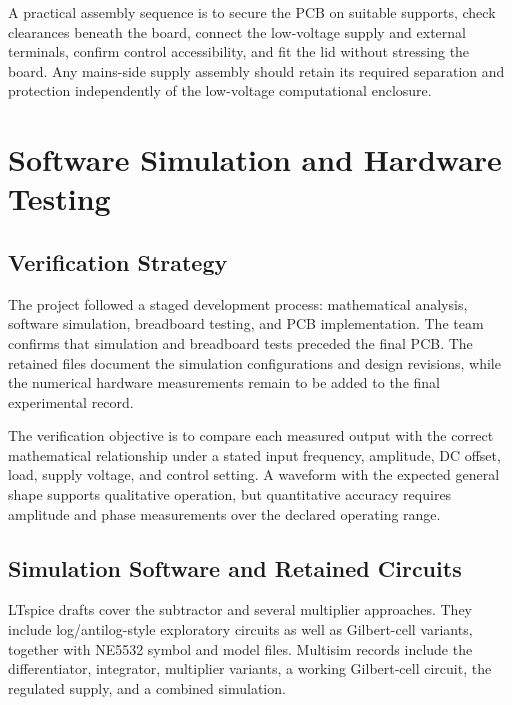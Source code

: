\documentclass[11pt,a4paper]{article}
\begin{document}
A practical assembly sequence is to secure the PCB on suitable supports, check clearances beneath the board, connect the low-voltage supply and external terminals, confirm control accessibility, and fit the lid without stressing the board. Any mains-side supply assembly should retain its required separation and protection independently of the low-voltage computational enclosure.


\section{Software Simulation and Hardware Testing}
\subsection{Verification Strategy}
The project followed a staged development process: mathematical analysis, software simulation, breadboard testing, and PCB implementation. The team confirms that simulation and breadboard tests preceded the final PCB. The retained files document the simulation configurations and design revisions, while the numerical hardware measurements remain to be added to the final experimental record.

The verification objective is to compare each measured output with the correct mathematical relationship under a stated input frequency, amplitude, DC offset, load, supply voltage, and control setting. A waveform with the expected general shape supports qualitative operation, but quantitative accuracy requires amplitude and phase measurements over the declared operating range.

\subsection{Simulation Software and Retained Circuits}
LTspice drafts cover the subtractor and several multiplier approaches. They include log/antilog-style exploratory circuits as well as Gilbert-cell variants, together with NE5532 symbol and model files. Multisim records include the differentiator, integrator, multiplier variants, a working Gilbert-cell circuit, the regulated supply, and a combined simulation.
\end{document}
